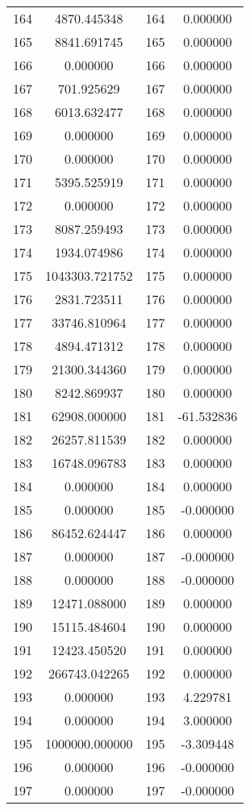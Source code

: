 \documentclass[12pt]{article}
\begin{document}
\begin{longtable}{@{}cccc@{}}
164 & 4870.445348 & 164 & 0.000000 \\
165 & 8841.691745 & 165 & 0.000000 \\
166 & 0.000000 & 166 & 0.000000 \\
167 & 701.925629 & 167 & 0.000000 \\
168 & 6013.632477 & 168 & 0.000000 \\
169 & 0.000000 & 169 & 0.000000 \\
170 & 0.000000 & 170 & 0.000000 \\
171 & 5395.525919 & 171 & 0.000000 \\
172 & 0.000000 & 172 & 0.000000 \\
173 & 8087.259493 & 173 & 0.000000 \\
174 & 1934.074986 & 174 & 0.000000 \\
175 & 1043303.721752 & 175 & 0.000000 \\
176 & 2831.723511 & 176 & 0.000000 \\
177 & 33746.810964 & 177 & 0.000000 \\
178 & 4894.471312 & 178 & 0.000000 \\
179 & 21300.344360 & 179 & 0.000000 \\
180 & 8242.869937 & 180 & 0.000000 \\
181 & 62908.000000 & 181 & -61.532836 \\
182 & 26257.811539 & 182 & 0.000000 \\
183 & 16748.096783 & 183 & 0.000000 \\
184 & 0.000000 & 184 & 0.000000 \\
185 & 0.000000 & 185 & -0.000000 \\
186 & 86452.624447 & 186 & 0.000000 \\
187 & 0.000000 & 187 & -0.000000 \\
188 & 0.000000 & 188 & -0.000000 \\
189 & 12471.088000 & 189 & 0.000000 \\
190 & 15115.484604 & 190 & 0.000000 \\
191 & 12423.450520 & 191 & 0.000000 \\
192 & 266743.042265 & 192 & 0.000000 \\
193 & 0.000000 & 193 & 4.229781 \\
194 & 0.000000 & 194 & 3.000000 \\
195 & 1000000.000000 & 195 & -3.309448 \\
196 & 0.000000 & 196 & -0.000000 \\
197 & 0.000000 & 197 & -0.000000 \\

\end{longtable}
\end{document}
